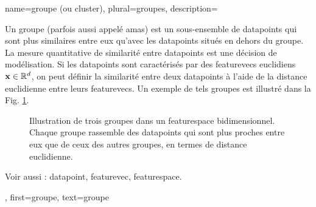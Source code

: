 {name={groupe (ou cluster)}, 
	plural={groupes}, 
	description={Un groupe (parfois aussi appelé amas) est un sous-ensemble de \glspl{datapoint} 
		qui sont plus similaires entre eux qu’avec les \glspl{datapoint} situés en dehors du groupe. 
		La mesure quantitative de similarité entre \glspl{datapoint} est une décision de modélisation. 
		Si les \glspl{datapoint} sont caractérisés par des \glspl{featurevec} euclidiens 
		${\bf x} \in \mathbb{R}^{d}$, on peut définir la similarité entre deux \glspl{datapoint} 
		à l’aide de la distance euclidienne entre leurs \glspl{featurevec}. Un exemple de tels groupes est illustré 
		dans la Fig. \ref{fig:clusters_dict}.\\
		\begin{figure}[H]
			\centering
			\caption{Illustration de trois groupes dans un \gls{featurespace} bidimensionnel. Chaque groupe rassemble des \glspl{datapoint} 
				qui sont plus proches entre eux que de ceux des autres groupes, en termes de distance euclidienne.}
			\label{fig:clusters_dict}
		\end{figure}
		Voir aussi : \gls{datapoint}, \gls{featurevec}, \gls{featurespace}.},
	first={groupe},
	text={groupe} 
}

